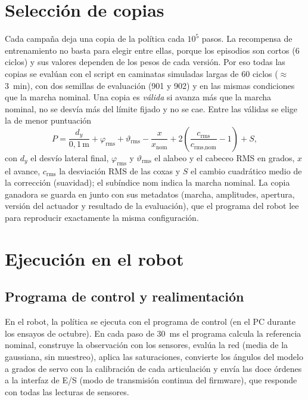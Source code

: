 \section{Selección de copias}

Cada campaña deja una copia de la política cada $10^5$ pasos. La recompensa de
entrenamiento no basta para elegir entre ellas, porque los episodios son cortos
(6 ciclos) y sus valores dependen de los pesos de cada versión. Por eso todas
las copias se evalúan con el script  en caminatas
simuladas largas de 60 ciclos ($\approx$3~min), con dos semillas de evaluación
(901 y 902) y en las mismas condiciones que la marcha nominal. Una copia es
\emph{válida} si avanza más que la marcha nominal, no se desvía más del límite
fijado y no se cae. Entre las válidas se elige la de menor puntuación
\begin{equation}
    P = \frac{d_y}{0{,}1\,\text{m}} + \varphi_{\text{rms}} + \vartheta_{\text{rms}}
    - \frac{x}{x_{\text{nom}}} + 2\left(\frac{c_{\text{rms}}}{c_{\text{rms,nom}}}-1\right) + S,
    \label{eq:puntuacion-seleccion}
\end{equation}
con $d_y$ el desvío lateral final, $\varphi_{\text{rms}}$ y $\vartheta_{\text{rms}}$
el alabeo y el cabeceo RMS en grados, $x$ el avance, $c_{\text{rms}}$ la
desviación RMS de las coxas y $S$ el cambio cuadrático medio de la corrección
(suavidad); el subíndice nom indica la marcha nominal. La copia ganadora se
guarda en  junto con sus metadatos (marcha, amplitudes,
apertura, versión del actuador y resultado de la evaluación), que el programa
del robot lee para reproducir exactamente la misma configuración.

\section{Ejecución en el robot}

\subsection{Programa de control y realimentación}

En el robot, la política se ejecuta con el programa de control
 (en el PC durante los ensayos de octubre). En cada paso de 30~ms el programa calcula la
referencia nominal, construye la observación con los sensores, evalúa la red
(media de la gaussiana, sin muestreo), aplica las saturaciones, convierte los
ángulos del modelo a grados de servo con la calibración de cada articulación y
envía las doce órdenes a la interfaz de E/S (modo de transmisión continua del
firmware), que responde con todas las lecturas de sensores.

